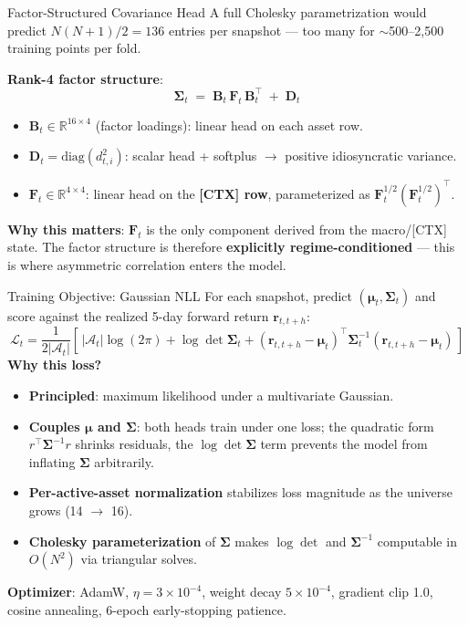 \documentclass[10pt, aspectratio=169]{beamer}
\newcommand{\R}{\mathbb{R}}
\newcommand{\Sig}{\boldsymbol{\Sigma}}
\newcommand{\bmu}{\boldsymbol{\mu}}
\newcommand{\br}{\mathbf{r}}
\newcommand{\bB}{\mathbf{B}}
\newcommand{\bF}{\mathbf{F}}
\newcommand{\bD}{\mathbf{D}}
\begin{document}
\begin{frame}{Factor-Structured Covariance Head}
A full Cholesky parametrization would predict $N(N{+}1)/2 = 136$ entries per snapshot ---
too many for $\sim$500--2{,}500 training points per fold.

\vspace{0.3em}
\textbf{Rank-4 factor structure}:
\[
\boxed{\;\Sig_t \;=\; \bB_t\, \bF_t\, \bB_t^\top \;+\; \bD_t\;}
\]
\begin{itemize}\setlength{\itemsep}{2pt}\footnotesize
  \item $\bB_t \in \R^{16\times 4}$ (factor loadings): linear head on each asset row.
  \item $\bD_t = \mathrm{diag}(d_{t,i}^2)$: scalar head + softplus $\to$ positive idiosyncratic variance.
  \item $\bF_t \in \R^{4\times 4}$: linear head on the \textbf{[CTX] row}, parameterized as $\bF_t^{1/2}(\bF_t^{1/2})^\top$.
\end{itemize}
\vspace{0.2em}
\textbf{Why this matters}: $\bF_t$ is the only component derived from the macro/[CTX] state. The factor structure is therefore \textbf{explicitly regime-conditioned} --- this is where asymmetric correlation enters the model.
\end{frame}

\begin{frame}{Training Objective: Gaussian NLL}
For each snapshot, predict $(\bmu_t, \Sig_t)$ and score against the realized 5-day forward return $\br_{t, t+h}$:
\vspace{-0.2em}
\[
\mathcal{L}_t = \frac{1}{2|\mathcal{A}_t|}\left[\,|\mathcal{A}_t|\log(2\pi) + \log\det \Sig_t + (\br_{t,t+h} - \bmu_t)^\top \Sig_t^{-1} (\br_{t,t+h} - \bmu_t)\,\right]
\]
\vspace{-0.3em}
\textbf{Why this loss?}
\begin{itemize}\setlength{\itemsep}{2pt}\footnotesize
  \item \textbf{Principled}: maximum likelihood under a multivariate Gaussian.
  \item \textbf{Couples $\bmu$ and $\Sig$}: both heads train under one loss; the quadratic form $r^\top\Sig^{-1}r$ shrinks residuals, the $\log\det\Sig$ term prevents the model from inflating $\Sig$ arbitrarily.
  \item \textbf{Per-active-asset normalization} stabilizes loss magnitude as the universe grows (14 $\to$ 16).
  \item \textbf{Cholesky parameterization} of $\Sig$ makes $\log\det$ and $\Sig^{-1}$ computable in $O(N^2)$ via triangular solves.
\end{itemize}
\textbf{Optimizer}: AdamW, $\eta=3\!\times\!10^{-4}$, weight decay $5\!\times\!10^{-4}$, gradient clip 1.0, cosine annealing, 6-epoch early-stopping patience.
\end{frame}
\end{document}
